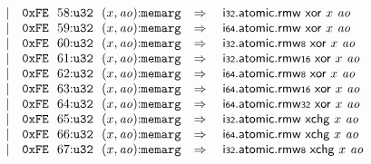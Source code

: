 $$\begin{array}[t]{@{}lrrl@{}l@{}l@{}l@{}}
& & | & \mathtt{0xFE}~~58{:}{\mathtt{u32}}~~(x, {\mathit{ao}}){:}{\mathtt{memarg}} & \quad\Rightarrow\quad{} & \mathsf{i{\scriptstyle 32}}{.}\mathsf{atomic}{.}\mathsf{rmw}~\mathsf{xor}~x~{\mathit{ao}} \\
& & | & \mathtt{0xFE}~~59{:}{\mathtt{u32}}~~(x, {\mathit{ao}}){:}{\mathtt{memarg}} & \quad\Rightarrow\quad{} & \mathsf{i{\scriptstyle 64}}{.}\mathsf{atomic}{.}\mathsf{rmw}~\mathsf{xor}~x~{\mathit{ao}} \\
& & | & \mathtt{0xFE}~~60{:}{\mathtt{u32}}~~(x, {\mathit{ao}}){:}{\mathtt{memarg}} & \quad\Rightarrow\quad{} & {\mathsf{i{\scriptstyle 32}}{.}\mathsf{atomic}{.}\mathsf{rmw}}{\mathsf{{\scriptstyle 8}}}~\mathsf{xor}~x~{\mathit{ao}} \\
& & | & \mathtt{0xFE}~~61{:}{\mathtt{u32}}~~(x, {\mathit{ao}}){:}{\mathtt{memarg}} & \quad\Rightarrow\quad{} & {\mathsf{i{\scriptstyle 32}}{.}\mathsf{atomic}{.}\mathsf{rmw}}{\mathsf{{\scriptstyle 16}}}~\mathsf{xor}~x~{\mathit{ao}} \\
& & | & \mathtt{0xFE}~~62{:}{\mathtt{u32}}~~(x, {\mathit{ao}}){:}{\mathtt{memarg}} & \quad\Rightarrow\quad{} & {\mathsf{i{\scriptstyle 64}}{.}\mathsf{atomic}{.}\mathsf{rmw}}{\mathsf{{\scriptstyle 8}}}~\mathsf{xor}~x~{\mathit{ao}} \\
& & | & \mathtt{0xFE}~~63{:}{\mathtt{u32}}~~(x, {\mathit{ao}}){:}{\mathtt{memarg}} & \quad\Rightarrow\quad{} & {\mathsf{i{\scriptstyle 64}}{.}\mathsf{atomic}{.}\mathsf{rmw}}{\mathsf{{\scriptstyle 16}}}~\mathsf{xor}~x~{\mathit{ao}} \\
& & | & \mathtt{0xFE}~~64{:}{\mathtt{u32}}~~(x, {\mathit{ao}}){:}{\mathtt{memarg}} & \quad\Rightarrow\quad{} & {\mathsf{i{\scriptstyle 64}}{.}\mathsf{atomic}{.}\mathsf{rmw}}{\mathsf{{\scriptstyle 32}}}~\mathsf{xor}~x~{\mathit{ao}} \\
& & | & \mathtt{0xFE}~~65{:}{\mathtt{u32}}~~(x, {\mathit{ao}}){:}{\mathtt{memarg}} & \quad\Rightarrow\quad{} & \mathsf{i{\scriptstyle 32}}{.}\mathsf{atomic}{.}\mathsf{rmw}~\mathsf{xchg}~x~{\mathit{ao}} \\
& & | & \mathtt{0xFE}~~66{:}{\mathtt{u32}}~~(x, {\mathit{ao}}){:}{\mathtt{memarg}} & \quad\Rightarrow\quad{} & \mathsf{i{\scriptstyle 64}}{.}\mathsf{atomic}{.}\mathsf{rmw}~\mathsf{xchg}~x~{\mathit{ao}} \\
& & | & \mathtt{0xFE}~~67{:}{\mathtt{u32}}~~(x, {\mathit{ao}}){:}{\mathtt{memarg}} & \quad\Rightarrow\quad{} & {\mathsf{i{\scriptstyle 32}}{.}\mathsf{atomic}{.}\mathsf{rmw}}{\mathsf{{\scriptstyle 8}}}~\mathsf{xchg}~x~{\mathit{ao}} \\

\end{array}$$
